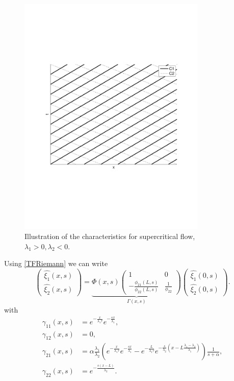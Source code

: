 \documentclass[preprint]{elsarticle}
\begin{document}
\begin{figure}[H] 
\centering
\includegraphics[trim= 0mm 75mm 0mm 70mm, width = 90mm]{subcr}
\caption{Illustration of the characteristics for supercritical flow, $\lambda_1 > 0, \lambda_2 < 0$.}
\label{fig:subcr}
\end{figure}


Using \eqref{TFRiemann} we can write 
\begin{equation}
\begin{pmatrix}
\hat{\xi_{1}}(x,s)\\
\hat{\xi_{2}}(x,s)
\end{pmatrix} = \underbrace{
\Phi(x,s) \begin{pmatrix}
1 & 0\\
-\frac{\phi_{21}\left(L,s\right)}{\phi_{22}\left(L,s\right)} & \frac{1}{\phi_{22}}
\end{pmatrix}}_\text{$\Gamma (x,s)$}
\begin{pmatrix}
\hat{\xi_{1}}\left(0,s\right)\\
\hat{\xi_{2}}\left(0,s\right)
\end{pmatrix}.
\end{equation}
with 
\begin{subequations}
\begin{align}
\gamma_{11}\left(x,s\right)&=e^{-\frac{x}{\lambda_{1}\tau}}e^{-\frac{sx}{\lambda_{1}}}, \\
\gamma_{12}\left(x,s\right)&=0, \\
\gamma_{21}\left(x,s\right)&=\alpha\frac{\lambda_{1}}{\lambda_{2}}\left(e^{-\frac{x}{\lambda_{1}\tau}}e^{-\frac{sx}{\lambda_{1}}}-e^{-\frac{L}{\lambda_{1}\tau}}e^{-\frac{s}{\lambda_{2}}\left(x-L\frac{\lambda_{1}-\lambda_{2}}{\lambda_{1}}\right)}\right)\frac{1}{s+\alpha}, \\
\gamma_{22}\left(x,s\right)&=e^{-\frac{s\left(x-L\right)}{\lambda_{2}}}.
\end{align}
\end{subequations}
\end{document}
